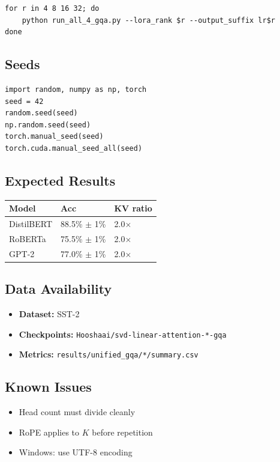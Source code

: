\begin{lstlisting}
for r in 4 8 16 32; do
    python run_all_4_gqa.py --lora_rank $r --output_suffix lr$r
done
\end{lstlisting}

\subsection{Seeds}

\begin{lstlisting}
import random, numpy as np, torch
seed = 42
random.seed(seed)
np.random.seed(seed)
torch.manual_seed(seed)
torch.cuda.manual_seed_all(seed)
\end{lstlisting}

\subsection{Expected Results}

\begin{table}[H]
\centering
\small
\begin{tabular}{lll}
\toprule
\textbf{Model} & \textbf{Acc} & \textbf{KV ratio} \\
\midrule
DistilBERT & 88.5\% $\pm$ 1\% & 2.0$\times$ \\
RoBERTa & 75.5\% $\pm$ 1\% & 2.0$\times$ \\
GPT-2 & 77.0\% $\pm$ 1\% & 2.0$\times$ \\
\bottomrule
\end{tabular}
\end{table}

\subsection{Data Availability}

\begin{itemize}
\item \textbf{Dataset:} SST-2
\item \textbf{Checkpoints:} \texttt{Hooshaai/svd-linear-attention-*-gqa}
\item \textbf{Metrics:} \texttt{results/unified\_gqa/*/summary.csv}

\end{itemize}
\subsection{Known Issues}

\begin{itemize}
\item Head count must divide cleanly
\item RoPE applies to $K$ before repetition
\item Windows: use UTF-8 encoding
\end{itemize}